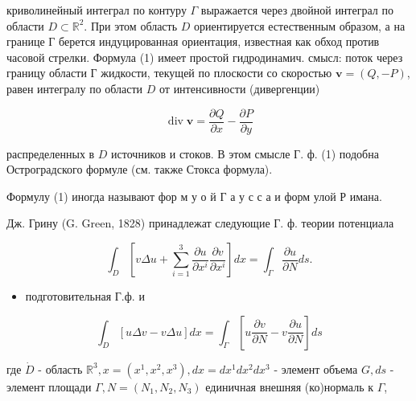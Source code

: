 \documentclass[10pt]{article}
\begin{document}
криволинейный интеграл по контуру $\Gamma$ выражается через двойной интеграл по области $D \subset \mathbb{R}^{2}$. При этом область $D$ ориентируется естественным образом, а на границе Г берется индуцированная ориентация, известная как обход против часовой стрелки. Формула (1) имеет простой гидродинамич. смысл: поток через границу области Г жидкости, текущей по плоскости со скоростью $\boldsymbol{v}=(Q,-P)$, равен интегралу по области $D$ от интенсивности (дивергенции)



\[

\operatorname{div} \boldsymbol{v}=\frac{\partial Q}{\partial x}-\frac{\partial P}{\partial y}

\]



распределенных в $D$ источников и стоков. В этом смысле Г. ф. (1) подобна Остроградского формуле (см. также Стокса формула).



Формулу (1) иногда называют фор м у о й Г а у с с а и форм улой Р имана.



Дж. Грину (G. Green, 1828) принадлежат следующие Г. ф. теории потенциала



\[

\int_{D}\left[v \Delta u+\sum_{i=1}^{3} \frac{\partial u}{\partial x^{i}} \frac{\partial v}{\partial x^{i}}\right] d x=\int_{\Gamma} \frac{\partial u}{\partial N} d s .

\]



\begin{itemize}

  \item подготовительная Г.ф. и

\end{itemize}



\[

\int_{D}[u \Delta v-v \Delta u] d x=\int_{\Gamma}\left[u \frac{\partial v}{\partial N}-v \frac{\partial u}{\partial N}\right] d s

\]



где $\dot{D}$ - область $\mathbb{R}^{3}, x=\left(x^{1}, x^{2}, x^{3}\right), d x=d x^{1} d x^{2} d x^{3}$ - элемент объема $G, d s$ - элемент площади $\Gamma, N=\left(N_{1}, N_{2}, N_{3}\right)$ единичная внешняя (ко)нормаль к $\Gamma$,
\end{document}
